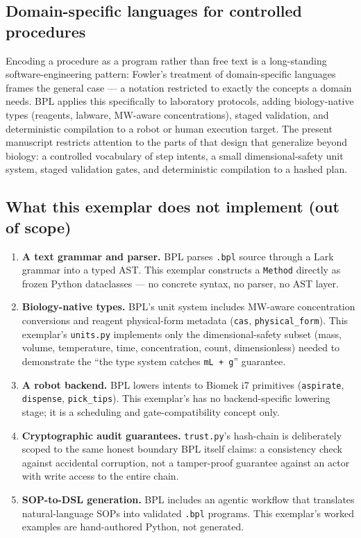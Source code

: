 \documentclass[
  english,
]{article}
\providecommand{\tightlist}{%
  \setlength{\itemsep}{0pt}\setlength{\parskip}{0pt}}
\begin{document}
\subsection{Domain-specific languages for controlled
procedures}\label{domain-specific-languages-for-controlled-procedures}

Encoding a procedure as a program rather than free text is a
long-standing software-engineering pattern: Fowler's treatment of
domain-specific languages \citep{fowler2010dsl} frames the general case
--- a notation restricted to exactly the concepts a domain needs. BPL
\citep{bpl2026} applies this specifically to laboratory protocols,
adding biology-native types (reagents, labware, MW-aware
concentrations), staged validation, and deterministic compilation to a
robot or human execution target. The present manuscript restricts
attention to the parts of that design that generalize beyond biology: a
controlled vocabulary of step intents, a small dimensional-safety unit
system, staged validation gates, and deterministic compilation to a
hashed plan.

\subsection{What this exemplar does not implement (out of
scope)}\label{what-this-exemplar-does-not-implement-out-of-scope}

\begin{enumerate}
\def\labelenumi{\arabic{enumi}.}
\tightlist
\item
  \textbf{A text grammar and parser.} BPL parses \texttt{.bpl} source
  through a Lark grammar into a typed AST. This exemplar constructs a
  \texttt{Method} directly as frozen Python dataclasses --- no concrete
  syntax, no parser, no AST layer.
\item
  \textbf{Biology-native types.} BPL's unit system includes MW-aware
  concentration conversions and reagent physical-form metadata
  (\texttt{cas}, \texttt{physical\_form}). This exemplar's
  \texttt{units.py} implements only the dimensional-safety subset (mass,
  volume, temperature, time, concentration, count, dimensionless) needed
  to demonstrate the ``the type system catches \texttt{mL\ +\ g}''
  guarantee.
\item
  \textbf{A robot backend.} BPL lowers intents to Biomek i7 primitives
  (\texttt{aspirate}, \texttt{dispense}, \texttt{pick\_tips}). This
  exemplar's  has no backend-specific lowering
  stage; it is a scheduling and gate-compatibility concept only.
\item
  \textbf{Cryptographic audit guarantees.} \texttt{trust.py}'s
  hash-chain is deliberately scoped to the same honest boundary BPL
  itself claims: a consistency check against accidental corruption, not
  a tamper-proof guarantee against an actor with write access to the
  entire chain.
\item
  \textbf{SOP-to-DSL generation.} BPL includes an agentic workflow that
  translates natural-language SOPs into validated \texttt{.bpl}
  programs. This exemplar's worked examples are hand-authored Python,
  not generated.
\end{enumerate}
\end{document}
